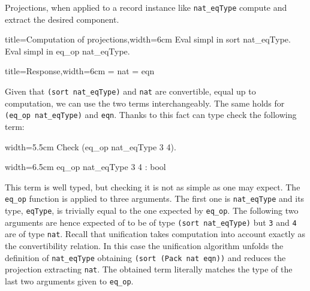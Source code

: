 Projections, when applied to a record instance like
\lstinline/nat_eqType/ compute and extract the desired component.

\begin{coq}{title=Computation of projections,width=6cm}
Eval simpl in sort nat_eqType.
Eval simpl in eq_op nat_eqType.
\end{coq}
\begin{coqout}{title=Response,width=6cm}
 = nat
 = eqn
\end{coqout}

Given that \lstinline/(sort nat_eqType)/ and \lstinline/nat/
are convertible, equal up to computation, we can use the two terms
interchangeably.  The same holds for \lstinline/(eq_op nat_eqType)/
and \lstinline/eqn/.  Thanks to this fact \Coq{} can type check the
following term:

\begin{coq}{width=5.5cm}
Check (eq_op nat_eqType 3 4).
\end{coq}
\begin{coqout}{width=6.5cm}
eq_op nat_eqType 3 4 : bool
\end{coqout}

This term is well typed, but checking it is not as simple as one may
expect.
The \lstinline/eq_op/ function is applied to three arguments.
The first one is \lstinline/nat_eqType/ and its type,
\lstinline/eqType/, is trivially equal to the one expected by
\lstinline/eq_op/.
The following two arguments are hence expected of to be of type
\lstinline/(sort nat_eqType)/ but \lstinline/3/ and \lstinline/4/ are
of type \lstinline/nat/.
Recall that unification takes computation into account exactly as the
convertibility relation.  In this case the unification algorithm
unfolds the definition of \lstinline/nat_eqType/ obtaining
\lstinline/(sort (Pack nat eqn))/ and reduces the projection
extracting  \lstinline/nat/.  The obtained term literally matches the
type of the last two arguments given to \lstinline/eq_op/.


